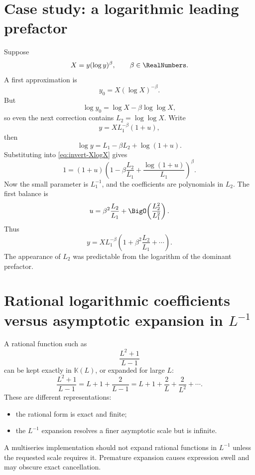 \documentclass[11pt,openany]{book}
\theoremstyle{definition}
\theoremstyle{plain}
\theoremstyle{remark}
\newcommand{\K}{\mathbb{K}}
\begin{document}
\section{Case study: a logarithmic leading prefactor}
Suppose
\begin{equation}\label{eq:invert-XlogX}
 X=y(\log y)^\beta,
 \qquad \beta\in\RealNumbers.
\end{equation}
A first approximation is
\[
 y_0=X(\log X)^{-\beta}.
\]
But
\[
 \log y_0=\log X-\beta\log\log X,
\]
so even the next correction contains \(L_2=\log\log X\).  Write
\[
 y=X L_1^{-\beta}(1+u),
\]
then
\[
 \log y=L_1-\beta L_2+\log(1+u).
\]
Substituting into \cref{eq:invert-XlogX} gives
\begin{equation}\label{eq:ulog-equation}
 1=(1+u)\left(
 1-\beta\frac{L_2}{L_1}
 +\frac{\log(1+u)}{L_1}
 \right)^\beta.
\end{equation}
Now the small parameter is \(L_1^{-1}\), and the coefficients are polynomials
in \(L_2\).  The first balance is
\begin{equation}\label{eq:u-first-logprefactor}
 u=\beta^2\frac{L_2}{L_1}
 +\BigO\!\left(\frac{L_2^2}{L_1^2}\right).
\end{equation}
Thus
\begin{equation}\label{eq:invert-XlogX-first}
 y=X L_1^{-\beta}
 \left(1+\beta^2\frac{L_2}{L_1}+\cdots\right).
\end{equation}
The appearance of \(L_2\) was predictable from the logarithm of the dominant
prefactor.

\section{Rational logarithmic coefficients versus asymptotic expansion in \texorpdfstring{\(L^{-1}\)}{L inverse}}
A rational function such as
\[
 \frac{L^2+1}{L-1}
\]
can be kept exactly in \(\K(L)\), or expanded for large \(L\):
\[
 \frac{L^2+1}{L-1}
 =L+1+\frac2{L-1}
 =L+1+\frac2L+\frac2{L^2}+\cdots.
\]
These are different representations:
\begin{itemize}
\item the rational form is exact and finite;
\item the \(L^{-1}\) expansion resolves a finer asymptotic scale but is
      infinite.
\end{itemize}
A multiseries implementation should not expand rational functions in \(L^{-1}\)
unless the requested scale requires it.  Premature expansion causes expression
swell and may obscure exact cancellation.
\end{document}
